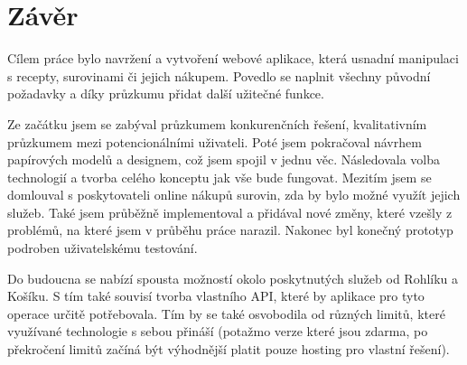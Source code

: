 
\chapter{Závěr}


Cílem práce bylo navržení a vytvoření webové aplikace, která usnadní manipulaci s recepty, surovinami či jejich nákupem.
Povedlo se naplnit všechny původní požadavky a díky průzkumu přidat další užitečné funkce.

Ze začátku jsem se zabýval průzkumem konkurenčních řešení, kvalitativním průzkumem mezi potencionálními uživateli. Poté
jsem pokračoval návrhem papírových modelů a designem, což jsem spojil v jednu věc. Následovala volba technologií a tvorba
celého konceptu jak vše bude fungovat. Mezitím jsem se domlouval s poskytovateli online nákupů surovin, zda by bylo možné
využít jejich služeb. Také jsem průběžně implementoval a přidával nové změny, které vzešly z problémů, na které jsem v průběhu
práce narazil. Nakonec byl konečný prototyp podroben uživatelskému testování.

Do budoucna se nabízí spousta možností okolo poskytnutých služeb od Rohlíku a Košíku. S tím také souvisí tvorba vlastního
API, které by aplikace pro tyto operace určitě potřebovala. Tím by se také osvobodila od různých limitů, které využívané
technologie s sebou přináší (potažmo verze které jsou zdarma, po překročení limitů začíná být výhodnější platit pouze hosting
pro vlastní řešení).
